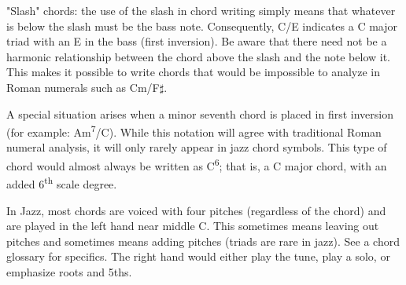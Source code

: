 \documentclass{article}
\begin{document}
"Slash" chords: the use of the slash in chord writing simply means that whatever is below the slash must be the bass note. Consequently, C/E indicates a C major triad with an E in the bass (first inversion). Be aware that there need not be a harmonic relationship between the chord above the slash and the note below it. This makes it possible to write chords that would be impossible to analyze in Roman numerals such as Cm/F$\sharp$.

A special situation arises when a minor seventh chord is placed in first inversion (for example: Am\textsuperscript{7}/C). While this notation will agree with traditional Roman numeral analysis, it will only rarely appear in jazz chord symbols. This type of chord would almost always be written as C\textsuperscript{6}; that is, a C major chord, with an added 6\textsuperscript{th} scale degree.

In Jazz, most chords are voiced with four pitches (regardless of the chord) and are played in the left hand near middle C. This sometimes means leaving out pitches and sometimes means adding pitches (triads are rare in jazz). See a chord glossary for specifics. The right hand would either play the tune, play a solo, or emphasize roots and 5ths.
\end{document}
